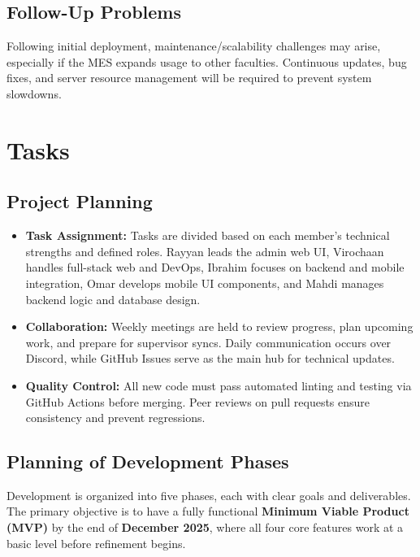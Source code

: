 \documentclass[12pt]{article}
\begin{document}
\subsection{Follow-Up Problems}
Following initial deployment, maintenance/scalability challenges may arise, especially if the MES expands usage to other faculties. Continuous updates, bug fixes, and server resource management will be required to prevent system slowdowns. 


\section{Tasks}
\subsection{Project Planning }

\begin{itemize}
    \item \textbf{Task Assignment:} Tasks are divided based on each member’s technical strengths and defined roles.
    Rayyan leads the admin web UI, Virochaan handles full-stack web and DevOps, Ibrahim focuses on backend and mobile integration, Omar develops mobile UI components, and Mahdi manages backend logic and database design.
    \item \textbf{Collaboration:} Weekly meetings are held to review progress, plan upcoming work, and prepare for supervisor syncs.
    Daily communication occurs over Discord, while GitHub Issues serve as the main hub for technical updates.
    \item \textbf{Quality Control:} All new code must pass automated linting and testing via GitHub Actions before merging.
    Peer reviews on pull requests ensure consistency and prevent regressions.
\end{itemize}

\subsection{Planning of Development Phases}

Development is organized into five phases, each with clear goals and deliverables.
The primary objective is to have a fully functional \textbf{Minimum Viable Product (MVP)} by the end of \textbf{December 2025}, where all four core features work at a basic level before refinement begins.
\end{document}
